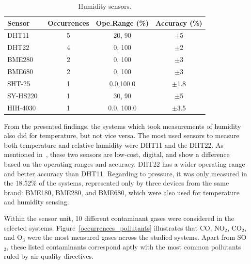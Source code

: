 \documentclass[10pt]{../style_src/imeko_acta}
\begin{document}
\begin{table}[!tb]
	\caption{Humidity sensors.}
	\label{tabHum}
	\centering
\begin{tabularx}{\columnwidth}{lCCC}
	\toprule
	Sensor	& Occurrences	& Ope.Range (\unit{\percent}) & Accuracy (\unit{\percent})\\
	\midrule
	DHT11~\cite{dht11}      & 5 &  20, 90       & $\pm$5\\
	DHT22~\cite{dht22}      & 4 & 0, 100        & $\pm$2 \\
	BME280~\cite{BME280}    & 2 & 0, 100        & $\pm$3  \\
	BME680~\cite{BME680}    & 2 & 0, 100        & $\pm$3 \\
	SHT-25~\cite{sht25}     & 1 & 0.0,100.0     & $\pm$1.8  \\
	SY-HS220~\cite{SYHS220} & 1 & 30, 90        & $\pm$5 \\
	HIH-4030~\cite{HIH4030} & 1 & 0.0, 100.0    & $\pm$3.5 \\
	\bottomrule
\end{tabularx}
\end{table}

From the presented findings, the systems which took measurements of humidity also did for temperature, but not vice versa.  The most used sensors to measure both temperature and relative humidity were DHT11 and the DHT22. As mentioned in~\cite{9826978}, these two sensors are low-cost, digital, and show a difference based on the operating ranges and accuracy. DHT22 has a wider operating range and better accuracy than DHT11. Regarding to pressure, it was only measured in the 18.52\% of the systems, represented only by three devices from the same brand: BME180, BME280, and BME680, which were also used for temperature and humidity sensing.

Within the sensor unit, 10 different contaminant gases were considered in the selected systems. Figure~\ref{occurrences_pollutants} illustrates that CO, NO$_{2}$, CO$_{2}$, and O$_{3}$ were the most measured gases across the studied systems. Apart from SO$_2$, these listed contaminants correspond aptly with the most common pollutants ruled by air quality directives.
\end{document}
